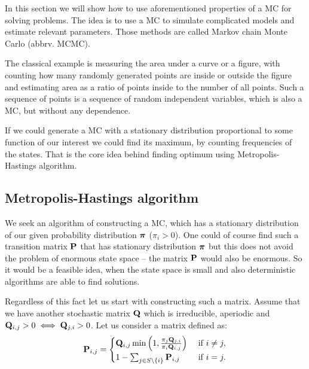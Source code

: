 In this section we will show how to use aforementioned properties of a MC for solving problems. The idea is to use a MC to simulate complicated models and estimate relevant parameters. Those methods are called Markov chain Monte Carlo (abbrv. MCMC).

The classical example is measuring the area under a curve or a figure, with counting how many randomly generated points are inside or outside the figure and estimating area as a ratio of points inside to the number of all points. Such a sequence of points is a sequence of random independent variables, which is also a MC, but without any dependence.

If we could generate a MC with a stationary distribution proportional to some function of our interest we could find its maximum, by counting frequencies of the states. That is the core idea behind finding optimum using Metropolis-Hastings algorithm.

\subsection{Metropolis-Hastings algorithm}
	We seek an algorithm of constructing a MC, which has a stationary distribution of our given probability distribution $\boldsymbol{\pi}$ ($\pi_i > 0$). One could of course find such a transition matrix $\mathbf{P}$ that has stationary distribution $\boldsymbol{\pi}$ but this does not avoid the problem of enormous state space -- the matrix $\mathbf{P}$ would also be enormous. So it would be a feasible idea, when the state space is small and also deterministic algorithms are able to find solutions. 
	
	Regardless of this fact let us start with constructing such a matrix. Assume that we have another stochastic matrix $\mathbf{Q}$ which is irreducible, aperiodic and $\mathbf{Q}_{i,j} >0 \iff \mathbf{Q}_{j,i} > 0$. Let us consider a matrix defined as:
	\begin{equation} \label{eq:PQ}
		\mathbf{P}_{i,j} = 
		\begin{cases}
		\mathbf{Q}_{i,j} \min \left(1, \frac{\pi_j \mathbf{Q}_{j,i}}{\pi_i \mathbf{Q}_{i,j}}\right) & \text{ if } i \neq j, \\ 
		1 - \sum_{j \in S \setminus \left\{ i \right\} } \mathbf{P}_{i,j}& \text{ if } i = j.
		\end{cases}
	\end{equation} 
	
